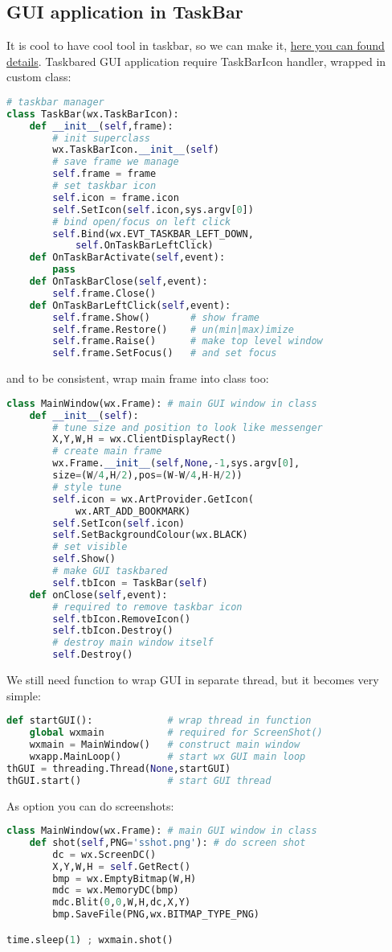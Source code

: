 \subsection{GUI application in TaskBar}

It is cool to have cool tool in taskbar, so we can make it,
\href{http://www.blog.pythonlibrary.org/2013/07/12/wxpython-how-to-minimize-to-system-tray/}{here you can found details}.
Taskbared GUI application require TaskBarIcon handler, wrapped in custom class:
\begin{lstlisting}[language=python]
# taskbar manager
class TaskBar(wx.TaskBarIcon):	
	def __init__(self,frame):
		# init superclass
		wx.TaskBarIcon.__init__(self)
		# save frame we manage
		self.frame = frame
		# set taskbar icon
		self.icon = frame.icon
		self.SetIcon(self.icon,sys.argv[0])
		# bind open/focus on left click
		self.Bind(wx.EVT_TASKBAR_LEFT_DOWN,
			self.OnTaskBarLeftClick)
	def OnTaskBarActivate(self,event):
		pass
	def OnTaskBarClose(self,event):
		self.frame.Close()
	def OnTaskBarLeftClick(self,event):
		self.frame.Show()		# show frame
		self.frame.Restore()	# un(min|max)imize
		self.frame.Raise()		# make top level window
		self.frame.SetFocus()	# and set focus
\end{lstlisting}
and to be consistent, wrap main frame into class too:
\begin{lstlisting}[language=python]
class MainWindow(wx.Frame): # main GUI window in class
	def __init__(self):
		# tune size and position to look like messenger
		X,Y,W,H = wx.ClientDisplayRect()
		# create main frame
		wx.Frame.__init__(self,None,-1,sys.argv[0],
		size=(W/4,H/2),pos=(W-W/4,H-H/2))
		# style tune
		self.icon = wx.ArtProvider.GetIcon(
			wx.ART_ADD_BOOKMARK)
		self.SetIcon(self.icon)
		self.SetBackgroundColour(wx.BLACK)
		# set visible
		self.Show()
		# make GUI taskbared
		self.tbIcon = TaskBar(self)
	def onClose(self,event):
		# required to remove taskbar icon
		self.tbIcon.RemoveIcon()
		self.tbIcon.Destroy()
		# destroy main window itself
		self.Destroy()
\end{lstlisting}
We still need function to wrap GUI in separate thread, but it becomes
very simple:
\begin{lstlisting}[language=python]
def startGUI():				# wrap thread in function
	global wxmain			# required for ScreenShot()
	wxmain = MainWindow()	# construct main window
	wxapp.MainLoop()		# start wx GUI main loop
thGUI = threading.Thread(None,startGUI)
thGUI.start()				# start GUI thread
\end{lstlisting}
As option you can do screenshots:
\begin{lstlisting}[language=python]
class MainWindow(wx.Frame): # main GUI window in class
	def shot(self,PNG='sshot.png'):	# do screen shot
		dc = wx.ScreenDC()
		X,Y,W,H = self.GetRect()
		bmp = wx.EmptyBitmap(W,H)
		mdc = wx.MemoryDC(bmp)
		mdc.Blit(0,0,W,H,dc,X,Y)
		bmp.SaveFile(PNG,wx.BITMAP_TYPE_PNG)

time.sleep(1) ; wxmain.shot()
\end{lstlisting}

